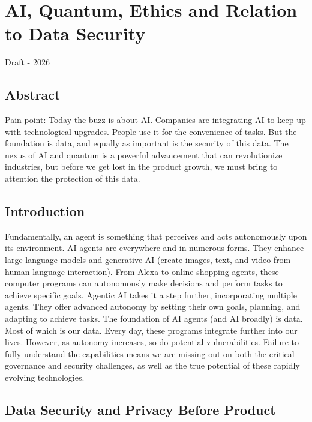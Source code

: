 \documentclass{article}
\begin{document}
\clearpage
\section{AI, Quantum, Ethics and Relation to Data Security}
Draft - 2026
\subsection{Abstract}

Pain point: Today the buzz is about AI. Companies are integrating AI to keep up with technological upgrades. People use it for the convenience of tasks. But the foundation is data, and equally as important is the security of this data. The nexus of AI and quantum is a powerful advancement that can revolutionize industries, but before we get lost in the product growth, we must bring to attention the protection of this data. 

\subsection{Introduction}
Fundamentally, an agent is something that perceives and acts autonomously upon its environment. AI agents are everywhere and in numerous forms. They enhance large language models and generative AI (create images, text, and video from human language interaction). From Alexa to online shopping agents, these computer programs can autonomously make decisions and perform tasks to achieve specific goals. Agentic AI takes it a step further, incorporating multiple agents. They offer advanced autonomy by setting their own goals, planning, and adapting to achieve tasks. The foundation of AI agents (and AI broadly) is data. Most of which is our data. Every day, these programs integrate further into our lives. However, as autonomy increases, so do potential vulnerabilities. Failure to fully understand the capabilities means we are missing out on both the critical governance and security challenges, as well as the true potential of these rapidly evolving technologies.\\

\subsection{Data Security and Privacy Before Product}
\end{document}
